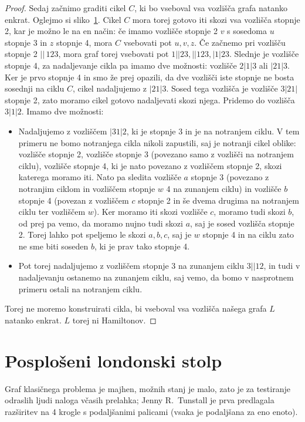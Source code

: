 \documentclass[11pt,a4paper]{article}
\theoremstyle{definition} %
\theoremstyle{plain} %
\begin{document}
\begin{proof}
    Sedaj začnimo graditi cikel $C$, ki bo vseboval vsa vozlišča grafa natanko enkrat. Oglejmo si sliko~\ref{}.
    Cikel $C$ mora torej gotovo iti skozi vsa vozlišča stopnje 2, kar je možno le na en način: če imamo vozlišče stopnje 2 $v$ s sosedoma $u$ stopnje 3 in $z$ stopnje 4, mora $C$ vsebovati pot $u,v,z$.
    Če začnemo pri vozlišču stopnje 2 $||\,123$, mora graf torej vsebovati pot $1||23, ||123, |1|23$. Slednje je vozlišče stopnje 4, za nadaljevanje cikla pa imamo dve možnosti: vozlišče $2|1|3$ ali $|21|3$. Ker je prvo stopnje 4 in smo že prej opazili, da dve vozlišči iste stopnje ne bosta sosednji na ciklu $C$, cikel nadaljujemo z $|21|3$. Sosed tega vozlišča je vozlišče $3|21|$ stopnje 2, zato moramo cikel gotovo nadaljevati skozi njega. Pridemo do vozlišča $3|1|2$. Imamo dve možnosti: 
    \begin{itemize}[label={-}]
        \item Nadaljujemo z vozliščem $|31|2$, ki je stopnje 3 in je na notranjem ciklu. V tem primeru ne bomo notranjega cikla nikoli zapustili, saj je notranji cikel oblike: vozlišče stopnje 2, vozlišče stopnje 3 (povezano samo z vozlišči na notranjem ciklu), vozlišče stopnje 4, ki je nato povezano z vozliščem stopnje 2, skozi katerega moramo iti. Nato pa sledita vozlišče $a$ stopnje 3 (povezano z notranjim ciklom in vozliščem stopnje $w$ 4 na zunanjem ciklu) in vozlišče $b$ stopnje 4 (povezan z vozliščem $c$ stopnje 2 in še dvema drugima na notranjem ciklu ter vozliščem $w$). Ker moramo iti skozi vozlišče $c$, moramo tudi skozi $b$, od prej pa vemo, da moramo nujno tudi skozi $a$, saj je sosed vozlišča stopnje 2. Torej lahko pot speljemo le skozi $a,b,c$, saj je $w$ stopnje 4 in na ciklu zato ne sme biti soseden $b$, ki je prav tako stopnje 4.
        \item Pot torej nadaljujemo z vozliščem stopnje 3 na zunanjem ciklu $3||12$, in tudi v nadaljevanju ostanemo na zunanjem ciklu, saj vemo, da bomo v nasprotnem primeru ostali na notranjem ciklu.
    \end{itemize}
    Torej ne moremo konstruirati cikla, bi vseboval vsa vozlišča našega grafa $L$ natanko enkrat. $L$ torej ni Hamiltonov.
    \qedhere
\end{proof}


\section{Posplošeni londonski stolp}
Graf klasičnega problema je majhen, možnih stanj je malo, zato je za testiranje odraslih ljudi naloga včasih prelahka; Jenny R.\ Tunstall je prva predlagala razširitev na 4 krogle s podaljšanimi palicami (vsaka je podaljšana za eno enoto).
\end{document}
